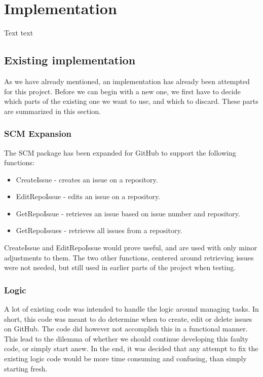 
\chapter{Implementation}
\label{ch:implementation}

Text text

\section{Existing implementation}

As we have already mentioned, an implementation has already been attempted for this project.
Before we can begin with a new one, we first have to decide which parts of the existing one we want to use, and which to discard.
These parts are summarized in this section.

\subsection{SCM Expansion}

The SCM package has been expanded for GitHub to support the following functions:

\begin{itemize}
    \item CreateIssue   - creates an issue on a repository.
    \item EditRepoIssue - edits an issue on a repository.
    \item GetRepoIssue  - retrieves an issue based on issue number and repository.
    \item GetRepoIssues - retrieves all issues from a repository.
\end{itemize}

CreateIssue and EditRepoIssue would prove useful, and are used with only minor adjustments to them.
The two other functions, centered around retrieving issues were not needed, but still used in earlier parts of the project when testing.

\subsection{Logic}

A lot of existing code was intended to handle the logic around managing tasks. 
In short, this code was meant to do determine when to create, edit or delete issues on GitHub.
The code did however not accomplish this in a functional manner.
This lead to the dilemma of whether we should continue developing this faulty code, or simply start anew.
In the end, it was decided that any attempt to fix the existing logic code would be more time consuming and confusing, than simply starting fresh.

